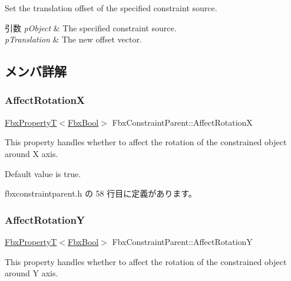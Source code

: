 Set the translation offset of the specified constraint source. 
\begin{DoxyParams}{引数}
{\em p\+Object} & The specified constraint source. \\
\hline
{\em p\+Translation} & The new offset vector. \\
\hline
\end{DoxyParams}


\subsection{メンバ詳解}
\mbox{\label{class_fbx_constraint_parent_ab364319598a6be917048f261160aced4}} 
\subsubsection{\texorpdfstring{Affect\+RotationX}{AffectRotationX}}
{\footnotesize\ttfamily \hyperlink{class_fbx_property_t}{Fbx\+PropertyT}$<$\hyperlink{fbxtypes_8h_a92e0562b2fe33e76a242f498b362262e}{Fbx\+Bool}$>$ Fbx\+Constraint\+Parent\+::\+Affect\+RotationX}

This property handles whether to affect the rotation of the constrained object around X axis.

Default value is true. 

 fbxconstraintparent.\+h の 58 行目に定義があります。

\mbox{\label{class_fbx_constraint_parent_a50b11f7aca12a04e5048680e0f7af486}} 
\subsubsection{\texorpdfstring{Affect\+RotationY}{AffectRotationY}}
{\footnotesize\ttfamily \hyperlink{class_fbx_property_t}{Fbx\+PropertyT}$<$\hyperlink{fbxtypes_8h_a92e0562b2fe33e76a242f498b362262e}{Fbx\+Bool}$>$ Fbx\+Constraint\+Parent\+::\+Affect\+RotationY}

This property handles whether to affect the rotation of the constrained object around Y axis.

